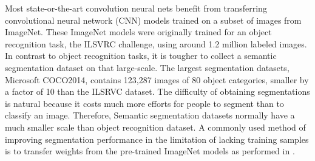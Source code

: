 
Most state-or-the-art convolution neural nets\cite{long2015fully,chen2016deeplab,he2017mask} benefit from transferring convolutional neural network (CNN) models trained on a subset of images from ImageNet.
These ImageNet models\cite{krizhevsky2012imagenet,simonyan2014very,szegedy2015going,he2016deep} were originally trained for an object recognition task, the ILSVRC\cite{russakovsky2015imagenet} challenge, using around 1.2 million labeled images.
In contrast to object recognition tasks, it is tougher to collect a  semantic segmentation dataset on that large-scale.
The largest segmentation datasets, Microsoft COCO2014\cite{lin2014microsoft}, contains 123,287 images of 80 object categories, smaller by a factor of 10 than the ILSRVC dataset.
The difficulty of obtaining segmentations is natural because it costs much more efforts for people to segment than to classify an image.
Therefore, Semantic segmentation datasets normally have a much smaller scale than object recognition dataset.
A commonly used method of improving segmentation performance in the limitation of lacking training samples is to transfer weights from the pre-trained ImageNet models as performed in \cite{long2015fully,chen2016deeplab}.



